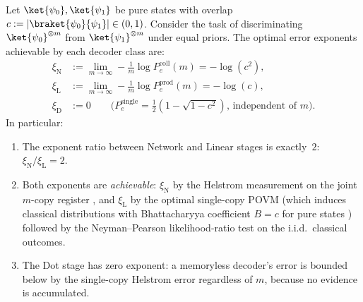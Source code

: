 \begin{proposition}
\label{prop:tight-gap}
Let $\ket{\psi_0},\ket{\psi_1}$ be pure states with overlap
$c:=|\braket{\psi_0}{\psi_1}|\in(0,1)$.
Consider the task of discriminating $\ket{\psi_0}^{\otimes m}$ from
$\ket{\psi_1}^{\otimes m}$ under equal priors.
The optimal error exponents achievable by each decoder class are:
%
\begin{align}
  \xi_{\mathrm{N}}
    &:= \lim_{m\to\infty}
        -\tfrac{1}{m}\log P_e^{\mathrm{coll}}(m)
    = -\log(c^2),
  \label{eq:xi-N}\\[4pt]
  \xi_{\mathrm{L}}
    &:= \lim_{m\to\infty}
        -\tfrac{1}{m}\log P_e^{\mathrm{prod}}(m)
    = -\log(c),
  \label{eq:xi-L}\\[4pt]
  \xi_{\mathrm{D}}
    &:= 0\qquad
    \bigl(\text{$P_e^{\mathrm{single}}
    = \tfrac{1}{2}(1-\sqrt{1-c^2})$,
    independent of $m$}\bigr).
  \label{eq:xi-D}
\end{align}
%
In particular:
\begin{enumerate}[leftmargin=2em,label=(\alph*)]
\item The exponent ratio between Network and Linear stages is
      exactly~$2$:
      $\xi_{\mathrm{N}}/\xi_{\mathrm{L}} = 2$.
\item Both exponents are \emph{achievable}:
      $\xi_{\mathrm{N}}$ by the Helstrom measurement on the joint
      $m$-copy register \citep{Audenaert2007,NussbaumSzkola2009},
      and $\xi_{\mathrm{L}}$ by the optimal single-copy POVM
      (which induces classical distributions with Bhattacharyya
      coefficient $B=c$ for pure states \citep{FuchsCaves1994})
      followed by the Neyman--Pearson likelihood-ratio test on the
      i.i.d.\ classical outcomes.
\item The Dot stage has zero exponent: a memoryless decoder's error
      is bounded below by the single-copy Helstrom error regardless
      of $m$, because no evidence is accumulated.
\end{enumerate}
\end{proposition}

